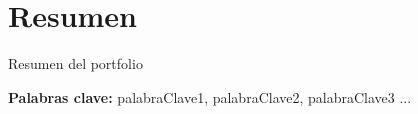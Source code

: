 \chapter*{Resumen}

Resumen del portfolio

\vspace{.5cm}

\textbf{Palabras clave:} palabraClave1, palabraClave2, palabraClave3 ... 
